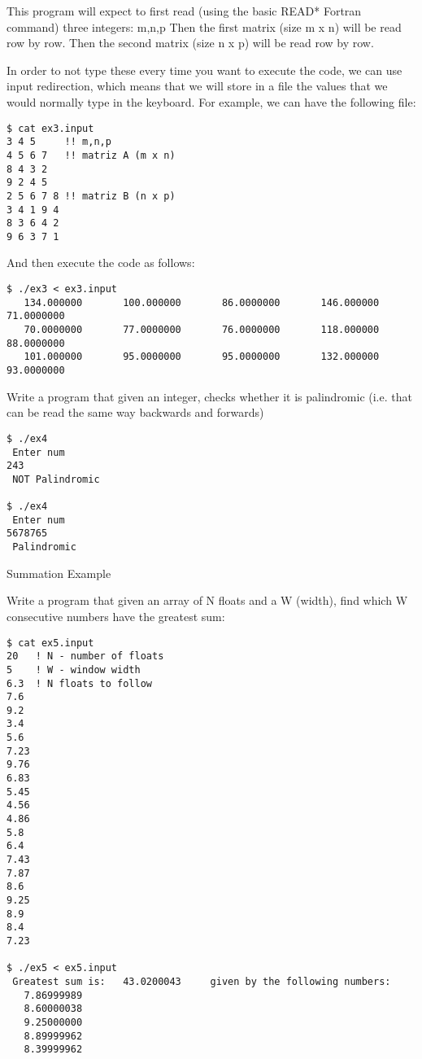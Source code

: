 This program will expect to first read (using the basic READ* Fortran command) three integers: m,n,p
Then the first matrix (size m x n) will be read row by row.
Then the second matrix (size n x p) will be read row by row.

In order to not type these every time you want to execute the code, we can use
input redirection, which means that we will store in a file the values that we would
normally type in the keyboard. For example, we can have the following file:

\begin{verbatim}
$ cat ex3.input
3 4 5     !! m,n,p
4 5 6 7   !! matriz A (m x n)
8 4 3 2
9 2 4 5
2 5 6 7 8 !! matriz B (n x p)
3 4 1 9 4
8 3 6 4 2
9 6 3 7 1
\end{verbatim}

And then execute the code as follows:

\begin{verbatim}
$ ./ex3 < ex3.input
   134.000000       100.000000       86.0000000       146.000000       71.0000000    
   70.0000000       77.0000000       76.0000000       118.000000       88.0000000    
   101.000000       95.0000000       95.0000000       132.000000       93.0000000
\end{verbatim}

 {Write a program that given an integer, checks whether it is
  palindromic (i.e. that can be read the same way backwards and forwards)}

\begin{verbatim}
$ ./ex4
 Enter num
243
 NOT Palindromic

$ ./ex4
 Enter num
5678765
 Palindromic
\end{verbatim}

 {Summation Example}

Write a program that given an array of N floats and a W (width), find which W
consecutive numbers have the greatest sum:

\begin{verbatim}
$ cat ex5.input
20   ! N - number of floats
5    ! W - window width
6.3  ! N floats to follow
7.6 
9.2 
3.4 
5.6 
7.23 
9.76 
6.83 
5.45 
4.56
4.86 
5.8 
6.4 
7.43 
7.87 
8.6 
9.25 
8.9 
8.4 
7.23

$ ./ex5 < ex5.input
 Greatest sum is:   43.0200043     given by the following numbers:
   7.86999989    
   8.60000038    
   9.25000000    
   8.89999962    
   8.39999962    
\end{verbatim}

